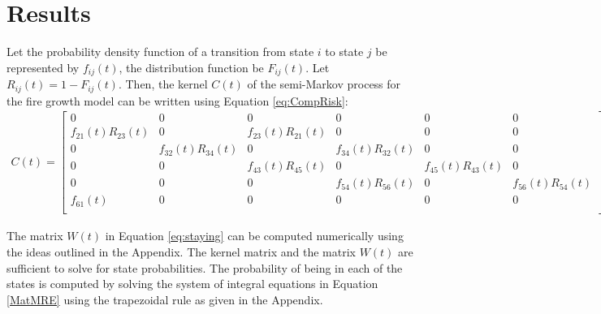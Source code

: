 \documentclass[12pt]{asme2ej}
\begin{document}
\section{Results}
Let the probability density function of a transition from state $i$ to state $j$ be represented by $f_{ij}(t)$, the distribution function be $F_{ij}(t)$. Let $R_{ij}(t) = 1-F_{ij}(t)$. Then, the kernel $C(t)$ of the semi-Markov process for the fire growth model can be written using Equation \ref{eq:CompRisk}:
\begin{align}
C(t) = 
\begin{bmatrix}
0	&	0	&	0	&	0	&	0	&	0	\\
f_{21}(t)R_{23}(t)	&	0	&	f_{23}(t)R_{21}(t)	&	0	&	0	&	0	\\
0	&	f_{32}(t)R_{34}(t)	&	0	&	f_{34}(t)R_{32}(t)	&	0	&	0	\\
0	&	0	&	f_{43}(t)R_{45}(t)	&	0	&	f_{45}(t)R_{43}(t)	&	0	\\
0	&	0	&	0	&	f_{54}(t)R_{56}(t)	&	0	&	f_{56}(t)R_{54}(t)	\\
f_{61}(t)	&	0	&	0	&	0	&	0	&	0	\\
\end{bmatrix}
\end{align}

The matrix $W(t)$ in Equation \ref{eq:staying} can be computed numerically using the ideas outlined in the Appendix. The kernel matrix and the matrix $W(t)$ are sufficient to solve for state probabilities. The probability of being in each of the states is computed  by solving the system of integral equations in Equation \ref{MatMRE} using the trapezoidal rule as given in the Appendix.
\end{document}
